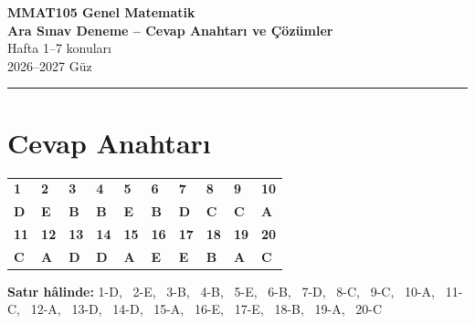 \documentclass[11pt,a4paper]{article}
\begin{document}
\begin{minipage}[c]{\textwidth}
{\LARGE\bfseries\color{anamavi} MMAT105 Genel Matematik}\\[4pt]
{\large\bfseries Ara Sınav Deneme -- Cevap Anahtarı ve Çözümler}\\[2pt]
{\normalsize Hafta 1--7 konuları}\\[6pt]
{\small 2026--2027 Güz}
\end{minipage}

\vspace{4pt}\noindent\textcolor{anamavi}{\rule{\textwidth}{1pt}}

\section*{Cevap Anahtarı}
\begin{center}
\renewcommand{\arraystretch}{1.5}
\begin{tabular}{|>{\centering\arraybackslash}p{1.1cm}|>{\centering\arraybackslash}p{1.1cm}|>{\centering\arraybackslash}p{1.1cm}|>{\centering\arraybackslash}p{1.1cm}|>{\centering\arraybackslash}p{1.1cm}|>{\centering\arraybackslash}p{1.1cm}|>{\centering\arraybackslash}p{1.1cm}|>{\centering\arraybackslash}p{1.1cm}|>{\centering\arraybackslash}p{1.1cm}|>{\centering\arraybackslash}p{1.1cm}|}\hline
\textbf{1} & \textbf{2} & \textbf{3} & \textbf{4} & \textbf{5} & \textbf{6} & \textbf{7} & \textbf{8} & \textbf{9} & \textbf{10}\\
\textbf{\color{cozumyesil}D} & \textbf{\color{cozumyesil}E} & \textbf{\color{cozumyesil}B} & \textbf{\color{cozumyesil}B} & \textbf{\color{cozumyesil}E} & \textbf{\color{cozumyesil}B} & \textbf{\color{cozumyesil}D} & \textbf{\color{cozumyesil}C} & \textbf{\color{cozumyesil}C} & \textbf{\color{cozumyesil}A}\\\hline
\textbf{11} & \textbf{12} & \textbf{13} & \textbf{14} & \textbf{15} & \textbf{16} & \textbf{17} & \textbf{18} & \textbf{19} & \textbf{20}\\
\textbf{\color{cozumyesil}C} & \textbf{\color{cozumyesil}A} & \textbf{\color{cozumyesil}D} & \textbf{\color{cozumyesil}D} & \textbf{\color{cozumyesil}A} & \textbf{\color{cozumyesil}E} & \textbf{\color{cozumyesil}E} & \textbf{\color{cozumyesil}B} & \textbf{\color{cozumyesil}A} & \textbf{\color{cozumyesil}C}\\\hline
\end{tabular}
\end{center}
{\small\textbf{Satır hâlinde:} 1-D, \ 2-E, \ 3-B, \ 4-B, \ 5-E, \ 6-B, \ 7-D, \ 8-C, \ 9-C, \ 10-A, \ 11-C, \ 12-A, \ 13-D, \ 14-D, \ 15-A, \ 16-E, \ 17-E, \ 18-B, \ 19-A, \ 20-C}
\end{document}
